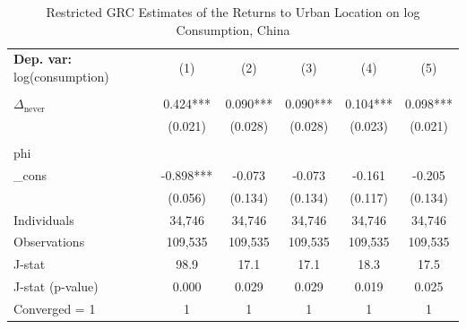 \begin{table}[htbp] \centering \begin{threeparttable}
 \caption{Restricted GRC Estimates of the Returns to Urban Location on log Consumption, China} 
 \label{tab:GRC_CHN_consumption_urban_unb} 
\begin{tabular}{l ccccc} \toprule  \textbf{Dep. var:}  log(consumption) 
                    &\multicolumn{1}{c}{(1)}   &\multicolumn{1}{c}{(2)}   &\multicolumn{1}{c}{(3)}   &\multicolumn{1}{c}{(4)}   &\multicolumn{1}{c}{(5)}   \\
                    &               &               &               &               &               \\
\addlinespace
$\Delta_{\text{never}}$&       0.424***&       0.090***&       0.090***&       0.104***&       0.098***\\
                    &     (0.021)   &     (0.028)   &     (0.028)   &     (0.023)   &     (0.021)   \\
                    &               &               &               &               &               \\
\addlinespace
phi                 &               &               &               &               &               \\
_cons               &      -0.898***&      -0.073   &      -0.073   &      -0.161   &      -0.205   \\
                    &     (0.056)   &     (0.134)   &     (0.134)   &     (0.117)   &     (0.134)   \\
\addlinespace
Individuals         &      34,746   &      34,746   &      34,746   &      34,746   &      34,746   \\
Observations        &     109,535   &     109,535   &     109,535   &     109,535   &     109,535   \\
J-stat              &        98.9   &        17.1   &        17.1   &        18.3   &        17.5   \\
J-stat (p-value)    &       0.000   &       0.029   &       0.029   &       0.019   &       0.025   \\
Converged = 1       &           1   &           1   &           1   &           1   &           1   \\

\end{tabular}
\end{threeparttable}
\end{table}
